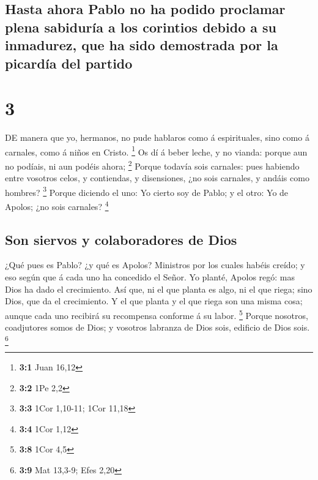 \hypertarget{hasta-ahora-pablo-no-ha-podido-proclamar-plena-sabiduruxeda-a-los-corintios-debido-a-su-inmadurez-que-ha-sido-demostrada-por-la-picarduxeda-del-partido}{%
\subsection{Hasta ahora Pablo no ha podido proclamar plena sabiduría a
los corintios debido a su inmadurez, que ha sido demostrada por la
picardía del
partido}\label{hasta-ahora-pablo-no-ha-podido-proclamar-plena-sabiduruxeda-a-los-corintios-debido-a-su-inmadurez-que-ha-sido-demostrada-por-la-picarduxeda-del-partido}}

\hypertarget{section-2}{%
\section{3}\label{section-2}}

 DE manera que yo, hermanos, no pude hablaros como á
espirituales, sino como á carnales, como á niños en Cristo. \footnote{\textbf{3:1}
  Juan 16,12}  Os dí á beber leche, y no vianda: porque aun
no podíais, ni aun podéis ahora; \footnote{\textbf{3:2} 1Pe 2,2}
 Porque todavía sois carnales: pues habiendo entre vosotros
celos, y contiendas, y disensiones, ¿no sois carnales, y andáis como
hombres? \footnote{\textbf{3:3} 1Cor 1,10-11; 1Cor 11,18} 
Porque diciendo el uno: Yo cierto soy de Pablo; y el otro: Yo de Apolos;
¿no sois carnales? \footnote{\textbf{3:4} 1Cor 1,12}

\hypertarget{son-siervos-y-colaboradores-de-dios}{%
\subsection{Son siervos y colaboradores de
Dios}\label{son-siervos-y-colaboradores-de-dios}}

 ¿Qué pues es Pablo? ¿y qué es Apolos? Ministros por los
cuales habéis creído; y eso según que á cada uno ha concedido el Señor.
 Yo planté, Apolos regó: mas Dios ha dado el crecimiento.
 Así que, ni el que planta es algo, ni el que riega; sino
Dios, que da el crecimiento.  Y el que planta y el que riega
son una misma cosa; aunque cada uno recibirá su recompensa conforme á su
labor. \footnote{\textbf{3:8} 1Cor 4,5}  Porque nosotros,
coadjutores somos de Dios; y vosotros labranza de Dios sois, edificio de
Dios sois. \footnote{\textbf{3:9} Mat 13,3-9; Efes 2,20}

